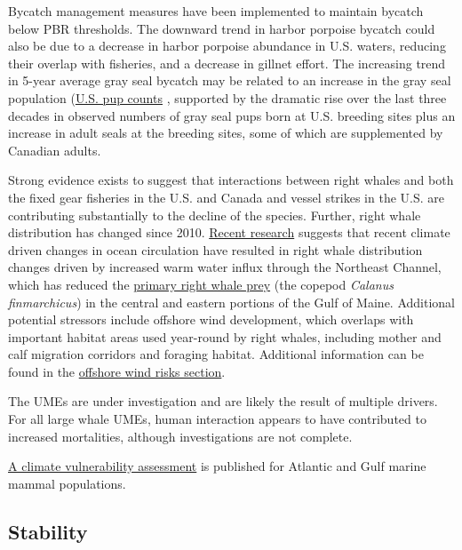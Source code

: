 \documentclass[
  10pt,
]{article}
\begin{document}
Bycatch management measures have been implemented to maintain bycatch below PBR thresholds. The downward trend in harbor porpoise bycatch could also be due to a decrease in harbor porpoise abundance in U.S. waters, reducing their overlap with fisheries, and a decrease in gillnet effort. The increasing trend in 5-year average gray seal bycatch may be related to an increase in the gray seal population (\href{https://noaa-edab.github.io/catalog/seal_pups.html}{U.S. pup counts} , supported by the dramatic rise over the last three decades in observed numbers of gray seal pups born at U.S. breeding sites plus an increase in adult seals at the breeding sites, some of which are supplemented by Canadian adults.

Strong evidence exists to suggest that interactions between right whales and both the fixed gear fisheries in the U.S. and Canada and vessel strikes in the U.S. are contributing substantially to the decline of the species. Further, right whale distribution has changed since 2010. \href{https://noaa-edab.github.io/catalog/narw.html}{Recent research} suggests that recent climate driven changes in ocean circulation have resulted in right whale distribution changes driven by increased warm water influx through the Northeast Channel, which has reduced the \href{https://noaa-edab.github.io/catalog/preyfield_energy.html}{primary right whale prey} (the copepod \emph{Calanus finmarchicus}) in the central and eastern portions of the Gulf of Maine. Additional potential stressors include offshore wind development, which overlaps with important habitat areas used year-round by right whales, including mother and calf migration corridors and foraging habitat. Additional information can be found in the \hyperref[other-ocean-uses-offshore-wind]{offshore wind risks section}.

The UMEs are under investigation and are likely the result of multiple drivers. For all large whale UMEs, human interaction appears to have contributed to increased mortalities, although investigations are not complete.

\href{https://journals.plos.org/plosone/article?id=10.1371/journal.pone.0290643}{A climate vulnerability assessment} is published for Atlantic and Gulf marine mammal populations.

\subsection{Stability}\label{stability}
\end{document}
